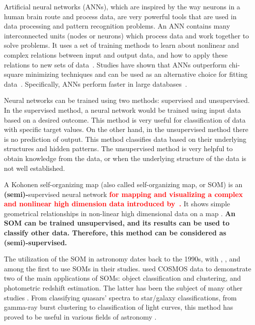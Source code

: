 Artificial neural networks (ANNs), which are inspired by the way neurons in a human brain route and process data, are very powerful tools that are used in data processing and pattern recognition problems.
An ANN contains many interconnected units (nodes or neurons) which process data and work together to solve problems.
It uses a set of training methods to learn about nonlinear and complex relations between input and output data, and how to apply these relations to new sets of data~\citep[e.g.][]{Hossein14,Hossein16,Ellison16a, Ellison16b}.
Studies have shown that ANNs outperform chi-square minimizing techniques and can be used as an alternative choice for fitting data~\citep[e.g.][]{Marquez91}.
Specifically, ANNs perform faster in large databases~\citep[][]{Gulati97}.

Neural networks can be trained using two methods: supervised and unsupervised.
In the supervised method, a neural network would be trained using input data based on a desired outcome.
This method is very useful for classification of data with specific target values.
On the other hand, in the unsupervised method there is no prediction of output.
This method classifies data based on their underlying structures and hidden patterns.
The unsupervised method is very helpful to obtain knowledge from the data, or when the underlying structure of the data is not well established.

A Kohonen self-organizing map (also called self-organizing map, or SOM) is an \textbf{(semi)-}supervised neural network \textbf{\textcolor{red}{for mapping and visualizing a complex and nonlinear high dimension data introduced by~\citet{Kohonen82}.}}
It shows simple geometrical relationships in non-linear high dimensional data on a map \citep{Kohonen98}.
\textbf{An SOM can be trained unsupervised, and its results can be used to classify other data.
Therefore, this method can be considered as (semi)-supervised.}

The utilization of the SOM in astronomy dates back to the 1990s, with \citet[][]{Odewahn92}, \citet[][]{Hernandez94}, and \citet[][]{Murtagh95} among the first to use SOMs in their studies.
\citet{Geach12} used COSMOS data to demonstrate two of the main applications of SOMs: object classification and clustering, and photometric redshift estimation. The latter has been the subject of many other studies \citep[e.g.][]{Kind14a}.
From classifying quasars' spectra to star/galaxy classifications, from gamma-ray burst clustering to classification of light curves, this method has proved to be useful in various fields of astronomy \citep[e.g.][]{Maehoenen95, Miller96, Andreon00, Balastegui01, Rajaniemi02, Brett04, Scaringi09}.


